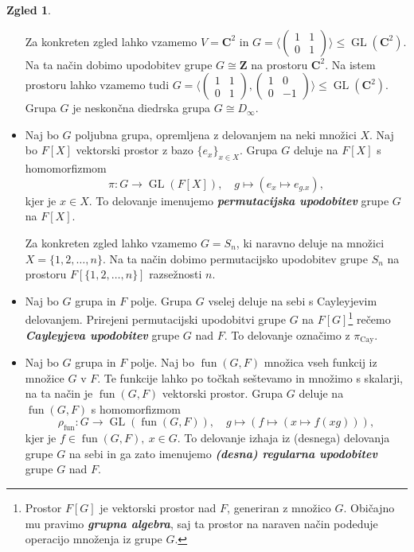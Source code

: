 \documentclass[11pt]{book}
\def\ZZ{\mathbf{Z}}
\def\CC{\mathbf{C}}
\DeclareMathOperator\fun{fun}
\DeclareMathOperator\GL{GL}
\DeclareMathOperator\Cay{Cay}
\def\definicija{\color{rdeca}\bf\em}
\theoremstyle{definition}
\theoremstyle{zgled}
\newtheorem*{zgled}{Zgled}
\theoremstyle{odprtproblem}
\theoremstyle{domacanaloga}
\theoremstyle{izrek}
\begin{document}
\begin{zgled}
\begin{itemize}
        Za konkreten zgled lahko vzamemo $V = \CC^2$ in $G = \langle \left( \begin{smallmatrix} 1 & 1 \\ 0 & 1 \end{smallmatrix} \right) \rangle \leq \GL(\CC^2)$. Na ta način dobimo upodobitev grupe $G \cong \ZZ$ na prostoru $\CC^2$. Na istem prostoru lahko vzamemo tudi $G = \langle 
        \left( \begin{smallmatrix} 1 & 1 \\ 0 & 1 \end{smallmatrix} \right), \left( \begin{smallmatrix} 1 & 0 \\ 0 & -1 \end{smallmatrix} \right) \rangle \leq \GL(\CC^2)$. Grupa $G$ je neskončna diedrska grupa $G \cong D_\infty$.

        \item Naj bo $G$ poljubna grupa, opremljena z delovanjem na neki množici $X$. Naj bo $F[X]$ vektorski prostor z bazo $\{ e_x \}_{x \in X}$. Grupa $G$ deluje na $F[X]$ s homomorfizmom
        \[
            \pi \colon G \to \GL(F[X]), \quad
            g \mapsto \left( e_x \mapsto e_{g.x} \right),
        \]
        kjer je $x \in X$. To delovanje imenujemo {\definicija permutacijska upodobitev} grupe $G$ na $F[X]$. 
        
        Za konkreten zgled lahko vzamemo $G = S_n$, ki naravno deluje na množici $X = \{ 1, 2, \dots, n \}$. Na ta način dobimo permutacijsko upodobitev grupe $S_n$ na prostoru $F[\{ 1, 2, \dots, n \}]$ razsežnosti $n$.
        \item Naj bo $G$ grupa in $F$ polje. Grupa $G$ vselej deluje na sebi s Cayleyjevim delovanjem. Prirejeni permutacijski upodobitvi grupe $G$ na $F[G]$\footnote{Prostor $F[G]$ je vektorski prostor nad $F$, generiran z množico $G$. Običajno mu pravimo {\definicija grupna algebra}, saj ta prostor na naraven način podeduje operacijo množenja iz grupe $G$.} rečemo {\definicija Cayleyjeva upodobitev} grupe $G$ nad $F$. To delovanje označimo z $\pi_{\Cay}$.
        \item Naj bo $G$ grupa in $F$ polje. Naj bo $\fun(G,F)$ množica vseh funkcij iz množice $G$ v $F$. Te funkcije lahko po točkah seštevamo in množimo s skalarji, na ta način je $\fun(G,F)$ vektorski prostor. Grupa $G$ deluje na $\fun(G,F)$ s homomorfizmom
        \[
            \rho_{\fun} \colon G \to \GL(\fun(G,F)), \quad
            g \mapsto \left( f \mapsto \left( x \mapsto f(xg) \right) \right),
        \]
        kjer je $f \in \fun(G,F), \ x \in G$. To delovanje izhaja iz (desnega) delovanja grupe $G$ na sebi in ga zato imenujemo {\definicija (desna) regularna upodobitev} grupe $G$ nad $F$.
    \end{itemize}
\end{zgled}
\end{document}

